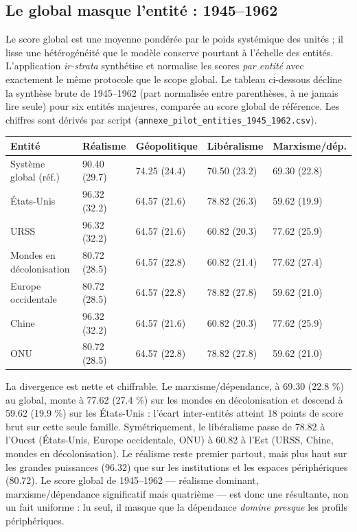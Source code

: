 \documentclass[11pt,a4paper]{article}
\begin{document}
\subsection{Le global masque l'entité : 1945--1962}

Le score global est une moyenne pondérée par le poids systémique des unités ; il lisse une hétérogénéité que le modèle conserve pourtant à l'échelle des entités. L'application \emph{ir-strata} synthétise et normalise les scores \emph{par entité} avec exactement le même protocole que le scope global. Le tableau ci-dessous décline la synthèse brute de 1945--1962 (part normalisée entre parenthèses, à ne jamais lire seule) pour six entités majeures, comparée au score global de référence. Les chiffres sont dérivés par script (\texttt{annexe\_pilot\_entities\_1945\_1962.csv}).

\begin{center}
\begin{tabular}{p{3.6cm}p{2.4cm}p{2.4cm}p{2.4cm}p{2.4cm}}
\hline
Entité & Réalisme & Géopolitique & Libéralisme & Marxisme/dép. \\
\hline
Système global (réf.) & 90.40 (29.7) & 74.25 (24.4) & 70.50 (23.2) & 69.30 (22.8) \\
États-Unis & 96.32 (32.2) & 64.57 (21.6) & 78.82 (26.3) & 59.62 (19.9) \\
URSS & 96.32 (32.2) & 64.57 (21.6) & 60.82 (20.3) & 77.62 (25.9) \\
Mondes en décolonisation & 80.72 (28.5) & 64.57 (22.8) & 60.82 (21.4) & 77.62 (27.4) \\
Europe occidentale & 80.72 (28.5) & 64.57 (22.8) & 78.82 (27.8) & 59.62 (21.0) \\
Chine & 96.32 (32.2) & 64.57 (21.6) & 60.82 (20.3) & 77.62 (25.9) \\
ONU & 80.72 (28.5) & 64.57 (22.8) & 78.82 (27.8) & 59.62 (21.0) \\
\hline
\end{tabular}
\end{center}

La divergence est nette et chiffrable. Le marxisme/dépendance, à 69.30 (22.8 \%) au global, monte à 77.62 (27.4 \%) sur les mondes en décolonisation et descend à 59.62 (19.9 \%) sur les États-Unis : l'écart inter-entités atteint 18 points de score brut sur cette seule famille. Symétriquement, le libéralisme passe de 78.82 à l'Ouest (États-Unis, Europe occidentale, ONU) à 60.82 à l'Est (URSS, Chine, mondes en décolonisation). Le réalisme reste premier partout, mais plus haut sur les grandes puissances (96.32) que sur les institutions et les espaces périphériques (80.72). Le score global de 1945--1962 --- réalisme dominant, marxisme/dépendance significatif mais quatrième --- est donc une résultante, non un fait uniforme : lu seul, il masque que la dépendance \emph{domine presque} les profils périphériques.
\end{document}
